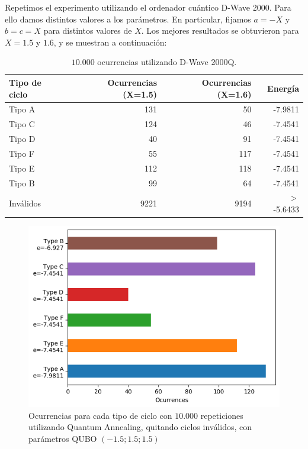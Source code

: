 \documentclass[11pt]{article}
\begin{document}
Repetimos el experimento utilizando el ordenador cuántico D-Wave 2000. Para ello damos distintos valores a los parámetros. En particular, fijamos $a=-X$ y $b=c=X$ para distintos valores de $X$. Los mejores resultados se obtuvieron para $X = 1.5$ y $1.6$, y se muestran a continuación:

\begin{table}[H]
	\centering
	\begin{tabular}{lrrr}
		\textbf{Tipo de ciclo} & \textbf{Ocurrencias (X=1.5)} & \textbf{Ocurrencias (X=1.6)} & \textbf{Energía} \\
		\hline
		Tipo A	& 131	& 50	& -7.9811	\\
		Tipo C	& 124	& 46	& -7.4541	\\
		Tipo D	& 40	& 91	& -7.4541	\\
		Tipo F	& 55	& 117	& -7.4541	\\
		Tipo E	& 112	& 118	& -7.4541	\\
		Tipo B	& 99	& 64	& -7.4541	\\    
		Inválidos & 9221	& 9194	& $>$ -5.6433                         
	\end{tabular}
	\caption{$10.000$ ocurrencias utilizando D-Wave 2000Q.}
	\label{tab:exp3}
\end{table}

\begin{figure}[H]
	\includegraphics[scale=0.75]{figures/experiment3 (1.5).png}
	\centering
	\caption{Ocurrencias para cada tipo de ciclo con $10.000$ repeticiones utilizando Quantum Annealing, quitando ciclos inválidos, con parámetros QUBO $(-1.5; 1.5; 1.5)$}
	\label{fig:exp3-occ1}
\end{figure}
\end{document}
